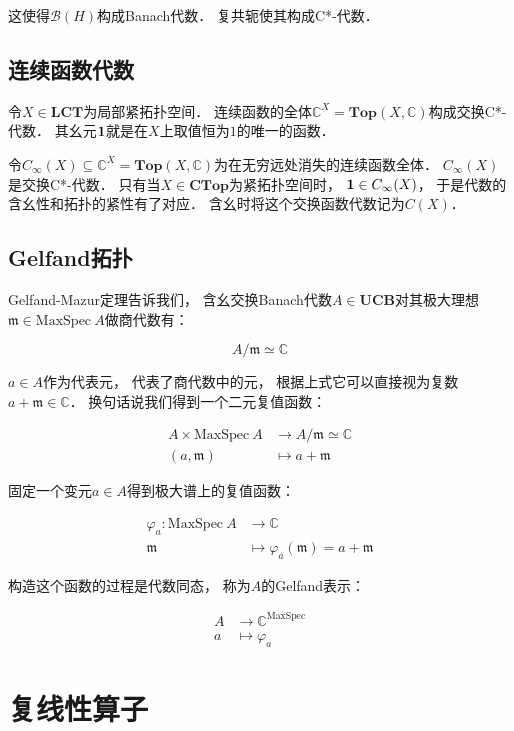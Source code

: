 \documentclass[10pt, openany]{book}
\begin{document}
这使得$\mathcal B(H)$构成Banach代数．
复共轭使其构成C*-代数．

\section{连续函数代数}

令$X\in\textbf{LCT}$为局部紧拓扑空间．
连续函数的全体$\mathbb C^X = \textbf{Top}(X,\mathbb C)$构成交换C*-代数．
其幺元$\textbf 1$就是在$X$上取值恒为$1$的唯一的函数．

令$C_\infty(X) \subseteq \mathbb C^X = \textbf{Top}(X,\mathbb C)$为在无穷远处消失的连续函数全体．
$C_\infty(X)$是交换C*-代数．
只有当$X\in\textbf{CTop}$为紧拓扑空间时，
$\textbf 1 \in C_\infty(X)$，
于是代数的含幺性和拓扑的紧性有了对应．
含幺时将这个交换函数代数记为$C(X)$．

\section{Gelfand拓扑}

Gelfand-Mazur定理告诉我们，
含幺交换Banach代数$A \in \textbf{UCB}$对其极大理想$\mathfrak m\in\text{MaxSpec} \ A$做商代数有：

$$
A/\mathfrak m \simeq \mathbb C
$$

$a \in A$作为代表元，
代表了商代数中的元，
根据上式它可以直接视为复数
$a + \mathfrak m \in \mathbb C$．
换句话说我们得到一个二元复值函数：

$$
\begin{aligned}
A \times \text{MaxSpec} \ A &\to A/\mathfrak m \simeq \mathbb C \\
(a,\mathfrak m) &\mapsto a + \mathfrak m 
\end{aligned}
$$

固定一个变元$a \in A$得到极大谱上的复值函数：

$$
\begin{aligned}
\varphi_a: \text{MaxSpec} \ A &\to \mathbb C \\
\mathfrak m &\mapsto \varphi_a(\mathfrak m) = a + \mathfrak m 
\end{aligned}
$$

构造这个函数的过程是代数同态，
称为$A$的Gelfand表示：

$$
\begin{aligned}
A &\to \mathbb C^{\text{MaxSpec}} \\
a &\mapsto \varphi_a 
\end{aligned}
$$



\chapter{复线性算子}
\end{document}
